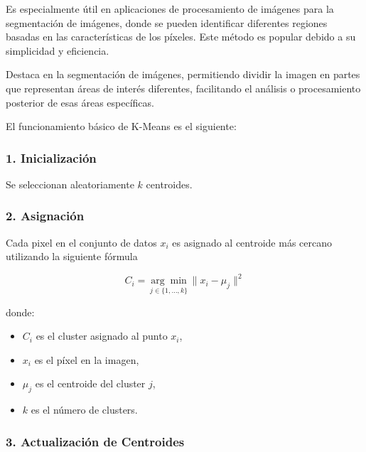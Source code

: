 Es especialmente útil en aplicaciones de procesamiento de imágenes para la segmentación de imágenes, donde se pueden identificar diferentes regiones basadas en las características de los píxeles. Este método es popular debido a su simplicidad y eficiencia.

Destaca en la segmentación de imágenes, permitiendo dividir la imagen en partes que representan áreas de interés diferentes, facilitando el análisis o procesamiento posterior de esas áreas específicas.

El funcionamiento básico de K-Means es el siguiente:

\subsubsection{1. Inicialización}

Se seleccionan aleatoriamente $k$ centroides.

\subsubsection{2. Asignación}

Cada pixel en el conjunto de datos $x_i$ es asignado al centroide más cercano utilizando la siguiente fórmula

$$C_i =\underset{j\in \lbrace 1,\ldots,k\rbrace }{\arg \min } \|x_i -\mu_j {\|}^2$$

donde:

\begin{itemize}
\setlength{\itemsep}{-1ex}
   \item{\begin{flushleft} $C_i$ es el cluster asignado al punto $x_i$, \end{flushleft}}
   \item{\begin{flushleft} $x_i$ es el píxel en la imagen, \end{flushleft}}
   \item{\begin{flushleft} $\mu_j$ es el centroide del cluster $j$, \end{flushleft}}
   \item{\begin{flushleft} $k$ es el número de clusters. \end{flushleft}}
\end{itemize}

\subsubsection{3. Actualización de Centroides}

